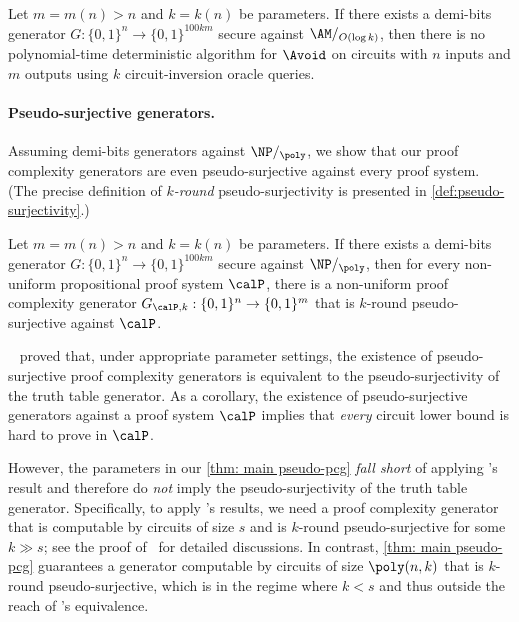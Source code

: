 \begin{theorem}\label{thm: main no-avoid^O(1)}
    Let $m = m(n) > n$ and $k = k(n)$ be parameters. If there exists a demi-bits generator $G: \{0,1\}^n \to \{0,1\}^{100km}$ secure against $\AM/_{O(\log k)}$, then there is no polynomial-time deterministic algorithm for $\Avoid$ on circuits with $n$ inputs and $m$ outputs using $k$ circuit-inversion oracle queries.
\end{theorem}


\paragraph{Pseudo-surjective generators.} Assuming demi-bits generators against $\NP/_{\poly}$, we show that our proof complexity generators are even pseudo-surjective against every proof system. (The precise definition of \emph{$k$-round} pseudo-surjectivity is presented in \autoref{def:pseudo-surjectivity}.)

\begin{theorem}\label{thm: main pseudo-pcg}
    Let $m = m(n) > n$ and $k = k(n)$ be parameters. If there exists a demi-bits generator $G:\{0,1\}^n\to\{0,1\}^{100km}$ secure against $\NP/_{\poly}$, then for every non-uniform propositional proof system $\calP$, there is a non-uniform proof complexity generator $G_{\calP, k}: \{0, 1\}^n \to \{0, 1\}^m$ that is $k$-round pseudo-surjective against $\calP$.
\end{theorem}





\Krajicek~\cite{Krajicek04} proved that, under appropriate parameter settings, the existence of pseudo-surjective proof complexity generators is equivalent to the pseudo-surjectivity of the truth table generator. As a corollary, the existence of pseudo-surjective generators against a proof system $\calP$ implies that \emph{every} circuit lower bound is hard to prove in $\calP$. 

However, the parameters in our \autoref{thm: main pseudo-pcg} \emph{fall short} of applying \Krajicek's result and therefore do \emph{not} imply the pseudo-surjectivity of the truth table generator. Specifically, to apply \Krajicek's results, we need a proof complexity generator that is computable by circuits of size $s$ and is $k$-round pseudo-surjective for some $k \gg s$; see the proof of~\cite[Theorem 4.2]{Krajicek04} for detailed discussions. In contrast, \autoref{thm: main pseudo-pcg} guarantees a generator computable by circuits of size $\poly(n, k)$ that is $k$-round pseudo-surjective, which is in the regime where $k<s$ and thus outside the reach of \Krajicek's equivalence.

